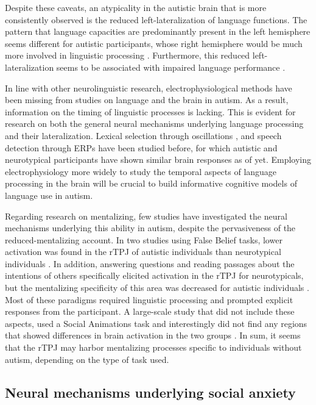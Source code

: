 Despite these caveats, an atypicality in the autistic brain that is more consistently observed is the reduced left-lateralization of language functions. The pattern that language capacities are predominantly present in the left hemisphere \citep{broca1865,szaflarski2006} seems different for autistic participants, whose right hemisphere would be much more involved in linguistic processing \citep{eyler2012,jouravlev2020,knaus2008,knaus2010}. Furthermore, this reduced left-lateralization seems to be associated with impaired language performance \citep{cermak2022,lindell2013}.

In line with other neurolinguistic research, electrophysiological methods have been missing from studies on language and the brain in autism. As a result, information on the timing of linguistic processes is lacking. This is evident for research on both the general neural mechanisms underlying language processing and their lateralization. Lexical selection through oscillations \citep{bloy2019}, and speech detection through ERPs \citep{kasai2005,oramcardy2005} have been studied before, for which autistic and neurotypical participants have shown similar brain responses as of yet. Employing electrophysiology more widely to study the temporal aspects of language processing in the brain will be crucial to build informative cognitive models of language use in autism. 

Regarding research on mentalizing, few studies have investigated the neural mechanisms underlying this ability in autism, despite the pervasiveness of the reduced-mentalizing account. In two studies using False Belief tasks, lower activation was found in the rTPJ of autistic individuals than neurotypical individuals \citep{nijhof2018,yuk2018}. In addition, answering questions and reading passages about the intentions of others specifically elicited activation in the rTPJ for neurotypicals, but the mentalizing specificity of this area was decreased for autistic individuals \citep{lombardo2011,mason2008}. Most of these paradigms required linguistic processing and prompted explicit responses from the participant. A large-scale study that did not include these aspects, used a Social Animations task and interestingly did not find any regions that showed differences in brain activation in the two groups \citep{moessnang2020}. In sum, it seems that the rTPJ may harbor mentalizing processes specific to individuals without autism, depending on the type of task used.

\subsection{Neural mechanisms underlying social anxiety}

